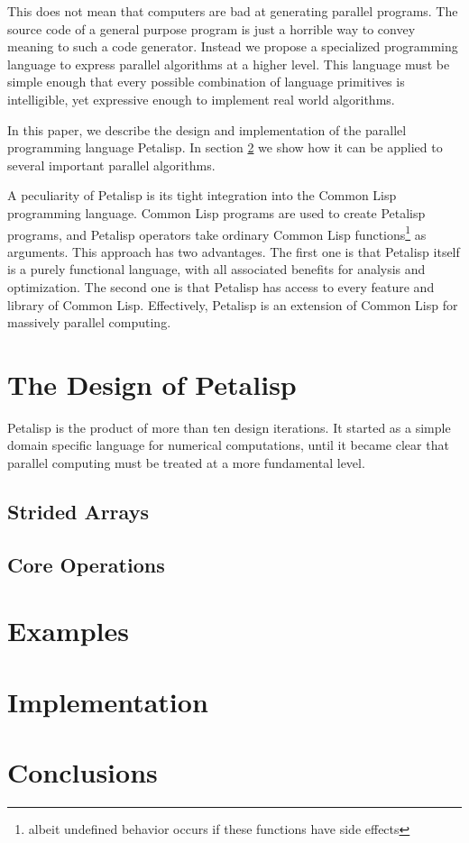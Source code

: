 \documentclass[siggraph, review=false]{acmart}
\begin{document}
This does not mean that computers are bad at generating parallel
programs. The source code of a general purpose program is just a horrible
way to convey meaning to such a code generator. Instead we propose a
specialized programming language to express parallel algorithms at a higher
level. This language must be simple enough that every possible combination
of language primitives is intelligible, yet expressive enough to implement
real world algorithms.

In this paper, we describe the design and implementation of the parallel
programming language Petalisp. In section \ref{sec:examples} we show how it
can be applied to several important parallel algorithms.

A peculiarity of Petalisp is its tight integration into the Common Lisp
programming language. Common Lisp programs are used to create Petalisp
programs, and Petalisp operators take ordinary Common Lisp
functions\footnote{albeit undefined behavior occurs if these functions have
  side effects} as arguments. This approach has two advantages. The first
one is that Petalisp itself is a purely functional language, with all
associated benefits for analysis and optimization. The second one is that
Petalisp has access to every feature and library of Common
Lisp. Effectively, Petalisp is an extension of Common Lisp for massively
parallel computing.

\section{The Design of Petalisp}
\label{sec:design}

Petalisp is the product of more than ten design iterations. It started as a
simple domain specific language for numerical computations, until it became
clear that parallel computing must be treated at a more fundamental
level.

\subsection{Strided Arrays}



\subsection{Core Operations}



\section{Examples}
\label{sec:examples}

\section{Implementation}
\label{sec:implementation}

\section{Conclusions}



\end{document}
